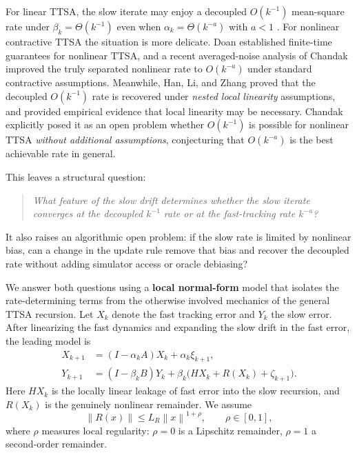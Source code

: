\documentclass{article}
\newcommand{\norm}[1]{\left\lVert #1\right\rVert}
\begin{document}
For linear TTSA, the slow iterate may enjoy a decoupled $O(k^{-1})$ mean-square rate under $\beta_k=\Theta(k^{-1})$ even when $\alpha_k=\Theta(k^{-a})$ with $a<1$ \cite{konda2004,kaledin2020,haque2024}. For nonlinear contractive TTSA the situation is more delicate. Doan \cite{doan2023} established finite-time guarantees for nonlinear TTSA, and a recent averaged-noise analysis of Chandak \cite{chandak20261} improved the truly separated nonlinear rate to $O(k^{-a})$ under standard contractive assumptions.  Meanwhile, Han, Li, and Zhang \cite{han2024} proved that the decoupled $O(k^{-1})$ rate is recovered under \emph{nested local linearity} assumptions, and provided empirical evidence that local linearity may be necessary. Chandak \cite{chandak20261} explicitly posed it as an open problem whether $O(k^{-1})$ is possible for nonlinear TTSA \emph{without additional assumptions}, conjecturing that $O(k^{-a})$ is the best achievable rate in general.



This leaves a structural question:
\begin{quote}
\emph{What feature of the slow drift determines whether the slow iterate converges at the decoupled $k^{-1}$ rate or at the fast-tracking rate $k^{-a}$?}
\end{quote}
It also raises an algorithmic open problem: if the slow rate is limited by nonlinear bias, can a change in the update rule remove that bias and recover the decoupled rate without adding simulator access or oracle debiasing?


We answer both questions using a \textbf{local normal-form} model that isolates the rate-determining terms from the otherwise involved mechanics of the general TTSA recursion. Let $X_k$ denote the fast tracking error and $Y_k$ the slow error. After linearizing the fast dynamics and expanding the slow drift in the fast error, the leading model is
\begin{align}
  X_{k+1} &= (I-\alpha_k A)X_k+\alpha_k\xi_{k+1}, \label{eq:intro-fast}\\
  Y_{k+1} &= (I-\beta_k B)Y_k+
    \beta_k\big(HX_k+R(X_k)+\zeta_{k+1}\big). \label{eq:intro-slow}
\end{align}
Here $HX_k$ is the locally linear leakage of fast error into the slow recursion, and $R(X_k)$ is the genuinely nonlinear remainder. We assume
\[
  \norm{R(x)} \le L_R\norm{x}^{1+\rho},\qquad \rho\in[0,1],
\]
where $\rho$ measures local regularity: $\rho=0$ is a Lipschitz remainder, $\rho=1$ a second‑order remainder.
\end{document}
